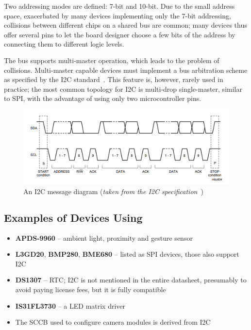 Two addressing modes are defined: 7-bit and 10-bit. Due to the small address space, exacerbated by many devices implementing only the 7-bit addressing, collisions between different chips on a shared bus are common; many devices thus offer several pins to let the board designer choose a few bits of the address by connecting them to different logic levels.

The bus supports multi-master operation, which leads to the problem of collisions. Multi-master capable devices must implement a bus arbitration scheme as specified by the \gls{I2C} standard~\cite{i2c-spec}. This feature is, however, rarely used in practice; the most common topology for \gls{I2C} is multi-drop single-master, similar to \gls{SPI}, with the advantage of using only two microcontroller pins.

\begin{figure}[h]
	\centering
	\includegraphics[width=.9\textwidth] {img/i2c-frame.png}
	\caption[\IIC message diagram]{\label{fig:i2c-frame}An \gls{I2C} message diagram (\textit{taken from the \gls{I2C} specification~\cite{i2c-spec}})}
\end{figure}

\subsection{Examples of Devices Using \texorpdfstring{\IIC}{I2C}}

\begin{itemize}
	\item \textbf{APDS-9960} -- ambient light, proximity and gesture sensor
	\item \textbf{L3GD20}, \textbf{BMP280}, \textbf{BME680} -- listed as \gls{SPI} devices, those also support \gls{I2C}
	\item \textbf{DS1307} -- \gls{RTC}; \gls{I2C} is not mentioned in the entire datasheet, presumably to avoid paying license fees, but it is fully compatible
	\item \textbf{IS31FL3730} -- a \gls{LED} matrix driver
	\item The \gls{SCCB} used to configure camera modules is derived from \gls{I2C}
\end{itemize}

